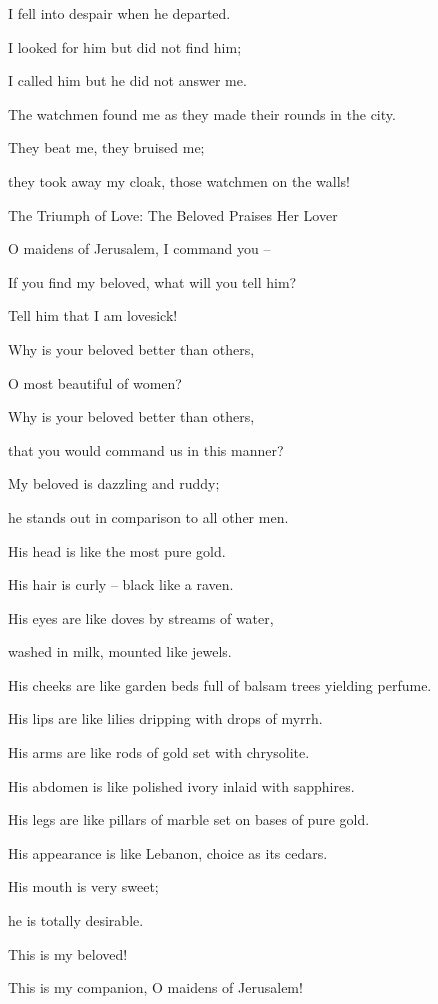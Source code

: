 {\par }{\Q I fell into despair
when
he departed.
\par }{\Q I looked
for him but did not
find
him;
\par }{\Q I called
him but he did not
answer me.
\par }{\Q {}The watchmen
found
me as they made their rounds
in the city.
\par }{\Q They beat
me, they bruised
me;
\par }{\Q they took away
my cloak,
those watchmen
on
the walls!
\par }{\SH The Triumph of Love: The Beloved Praises Her Lover
\par }{\SH 
{}
\par }{\Q {}O maidens
of Jerusalem, I command you –
\par }{\Q If you find my beloved, what will you tell him?
\par }{\Q Tell him that I am lovesick!
\par }{\SH 
{}
\par }{\Q {}Why
is your beloved
better than others,

\par }{\Q O
most beautiful
of women?
\par }{\Q Why
is
your beloved
better than others,
\par }{\Q that you would command us in this manner?
\par }{\SH 
{}
\par }{\Q {}My beloved
is dazzling
and ruddy;
\par }{\Q he stands out
in comparison to all other men.
\par }{\Q {}His head
is like the most pure gold.
\par }{\Q His hair
is curly –
black
like a raven.
\par }{\Q {}His eyes
are like doves
by
streams
of water,
\par }{\Q washed
in milk,
mounted
like
jewels.
\par }{\Q {}His cheeks
are like garden beds
full of balsam trees
yielding perfume.
\par }{\Q His lips
are like lilies
dripping
with drops
of myrrh.
\par }{\Q {}His arms
are like rods
of gold
set
with chrysolite.
\par }{\Q His abdomen
is like polished
ivory
inlaid
with sapphires.
\par }{\Q {}His legs
are like pillars
of marble
set
on
bases
of pure gold.
\par }{\Q His appearance
is like Lebanon,
choice
as its cedars.
\par }{\Q {}His mouth
is very sweet;
\par }{\Q he is totally desirable.
\par }{\Q This
is my beloved!
\par }{\Q This
is my companion,
O maidens
of Jerusalem!

}
